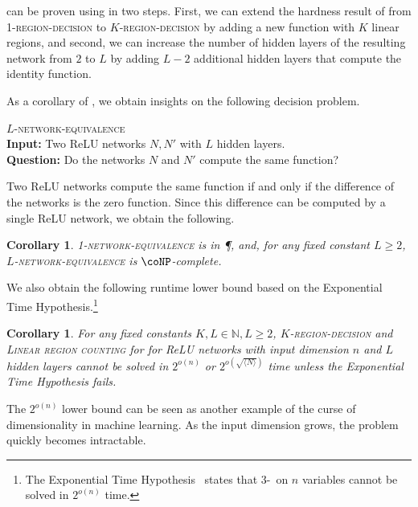 \documentclass{article}
\newtheorem{corollary}[theorem]{Corollary}
\begin{document}
 can be proven using  in two steps.
First, we can extend the hardness result of  from \textsc{1-region-decision} to \textsc{$K$-region-decision} by adding a new function with $K$ linear regions, and second, we can increase the number of hidden layers of the resulting network from $2$ to $L$ by adding $L-2$ additional hidden layers that compute the identity function.

As a corollary of , we obtain insights on the following decision problem.

\textsc{$L$-network-equivalence}
\\
\textbf{Input:} Two ReLU networks $N, N'$ with $L$ hidden layers.
\\
\textbf{Question:} Do the networks $N$ and $N'$ compute the same function?

Two ReLU networks compute the same function if and only if the difference of the networks is the zero function.
Since this difference can be computed by a single ReLU network, we obtain the following.
\begin{corollary}
\label{cor:euqality_of_two_relu_networks}
    \textsc{1-network-equivalence} is in \P{}, and, for any fixed constant $L\geq 2$, \textsc{$L$-network-equivalence} is $\coNP$-complete.
\end{corollary}
We also obtain the following runtime lower bound based on the Exponential Time Hypothesis.\footnote{The Exponential Time Hypothesis~\citep{impagliazzo2001complexity} states that 3-\SAT\ on $n$ variables cannot be solved in $2^{o(n)}$ time.}
\begin{corollary}
\label{cor:eth_lower_bound}
    For any fixed constants $K,L\in \mathbb{N}, L\geq 2$, \textsc{$K$-region-decision} and \textsc{Linear region counting} for  for ReLU networks with input dimension $n$ and $L$ hidden layers cannot be solved in $2^{o(n)}$ or $2^{o(\sqrt{\langle N\rangle})}$ time unless the Exponential Time Hypothesis fails.
\end{corollary}

The $2^{o(n)}$ lower bound can be seen as another example of the curse of dimensionality in machine learning.
As the input dimension grows, the problem quickly becomes intractable.
\end{document}
